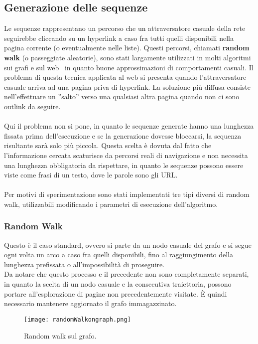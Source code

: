 \subsection{Generazione delle sequenze}
Le sequenze rappresentano un percorso che un attraversatore casuale della rete seguirebbe cliccando su un hyperlink a caso fra tutti quelli disponibili nella pagina corrente (o eventualmente nelle liste). Questi percorsi, chiamati \textbf{random walk} (o passeggiate aleatorie), sono stati largamente utilizzati in molti algoritmi sui grafi e sul web~\cite{aldous14} in quanto buone approssimazioni di comportamenti casuali. Il problema di questa tecnica applicata al web si presenta quando l'attraversatore casuale arriva ad una pagina priva di hyperlink. La soluzione più diffusa consiste nell'effettuare un ''salto'' verso una qualsiasi altra pagina quando non ci sono outlink da seguire. 
\\\\
Qui il problema non si pone, in quanto le sequenze generate hanno una lunghezza fissata prima dell'esecuzione e se la generazione dovesse bloccarsi, la sequenza risultante sarà solo più piccola. Questa scelta è dovuta dal fatto che l'informazione cercata scaturisce da percorsi reali di navigazione e non necessita una lunghezza obbligatoria da rispettare, in quanto le sequenze possono essere viste come frasi di un testo, dove le parole sono gli URL.
\\\\
Per motivi di sperimentazione sono stati implementati tre tipi diversi di random walk, utilizzabili modificando i parametri di esecuzione dell'algoritmo.

\subsubsection{Random Walk}
Questo è il caso standard, ovvero si parte da un nodo casuale del grafo e si segue ogni volta un arco a caso fra quelli disponibili, fino al raggiungimento della lunghezza prefissata o all'impossibilità di proseguire.
\\
Da notare che questo processo e il precedente non sono completamente separati, in quanto la scelta di un nodo casuale e la consecutiva traiettoria, possono portare all'esplorazione di pagine non precedentemente visitate. È quindi necessario mantenere aggiornato il grafo immagazzinato.
\begin{figure}[htb]
	\centering
	\texttt{[image: randomWalkongraph.png]}
	\caption{Random walk sul grafo. }
	\label{englishchinese}
\end{figure}
